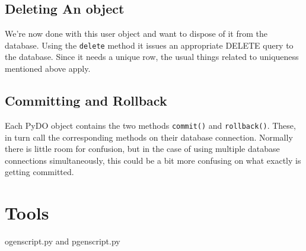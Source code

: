 \documentclass[titlepage]{manual}
\begin{document}
\section{Deleting An object}
We're now done with this user object and want to dispose of it from
the database.  Using the \texttt{delete} method it issues an
appropriate DELETE query to the database.  Since it needs a unique
row, the usual things related to uniqueness mentioned above apply.


\section{Committing and Rollback}
Each PyDO object contains the two methods \texttt{commit()} and
\texttt{rollback()}.  These, in turn call the corresponding methods on
their database connection.  Normally there is little room for
confusion, but in the case of using multiple database connections
simultaneously, this could be a bit more confusing on what exactly is
getting committed.

\chapter{Tools}
ogenscript.py and pgenscript.py
\end{document}
